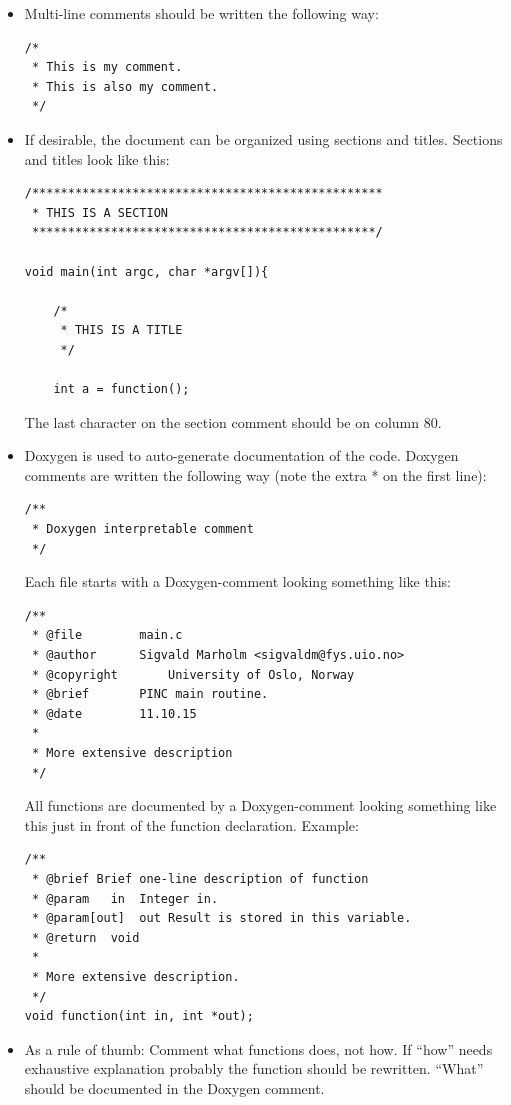 \documentclass[10pt,a4paper]{article}
\begin{document}
\begin{itemize}
	\item Multi-line comments should be written the following way:
	\begin{lstlisting}
/*
 * This is my comment.
 * This is also my comment.
 */
	\end{lstlisting}
	\newpage
	\item If desirable, the document can be organized using sections and titles. Sections and titles look like this:
	\begin{lstlisting}
/*************************************************
 * THIS IS A SECTION
 ************************************************/

void main(int argc, char *argv[]){

	/*
	 * THIS IS A TITLE
	 */

	int a = function();

	\end{lstlisting}
	The last character on the section comment should be on column 80.
	
	
	 \item Doxygen is used to auto-generate documentation of the code. Doxygen comments are written the following way (note the extra * on the first line):
	 \begin{lstlisting}
/**
 * Doxygen interpretable comment
 */
	 \end{lstlisting}
	 Each file starts with a Doxygen-comment looking something like this:
	 \begin{lstlisting}
/**
 * @file		main.c
 * @author		Sigvald Marholm <sigvaldm@fys.uio.no>
 * @copyright		University of Oslo, Norway
 * @brief		PINC main routine.
 * @date		11.10.15
 *
 * More extensive description
 */	 	
	 \end{lstlisting}
	 All functions are documented by a Doxygen-comment looking something like this just in front of the function declaration. Example: 
	 \begin{lstlisting}
/**
 * @brief Brief one-line description of function
 * @param	in	Integer in.
 * @param[out]	out	Result is stored in this variable.
 * @return	void
 *
 * More extensive description.
 */
void function(int in, int *out);
	\end{lstlisting}
	\item As a rule of thumb: Comment what functions does, not how. If ``how'' needs exhaustive explanation probably the function should be rewritten. ``What'' should be documented in the Doxygen comment.
\end{itemize}
\end{document}
